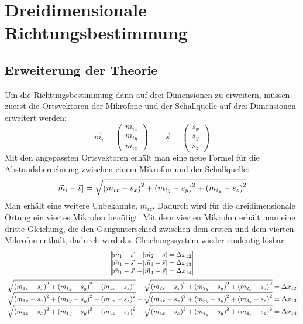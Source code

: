 \section{Dreidimensionale Richtungsbestimmung}
\subsection{Erweiterung der Theorie}
Um die Richtungsbestimmung dann auf drei Dimensionen zu erweitern, müssen zuerst die Ortsvektoren der Mikrofone und der Schallquelle auf drei Dimensionen erweitert werden:
\begin{equation}
    \vec{m}_i = \begin{pmatrix}
        m_{ix} \\
        m_{iy} \\
        m_{iz}
    \end{pmatrix} \quad\quad
    \vec{s} = \begin{pmatrix}
        {s_x} \\
        {s_y} \\
        {s_z}
    \end{pmatrix}
\end{equation}
Mit den angepassten Ortsvektoren erhält man eine neue Formel für die Abstandsberechnung zwischen einem Mikrofon und der Schallquelle:
\begin{equation}
    \abs{\vec{m}_i - \vec{s}} = \sqrt{{(m_{ix} - s_x)}^2 + {(m_{iy} - s_y)}^2 + {(m_{i_z} - s_z)}^2}
\end{equation}
Man erhält eine weitere Unbekannte, $m_{iz}$. Dadurch wird für die dreidimensionale Ortung ein viertes Mikrofon benötigt. Mit dem vierten Mikrofon erhält man eine dritte Gleichung, die den Gangunterschied zwischen dem ersten und dem vierten Mikrofon enthält, dadurch wird das Gleichungssystem wieder eindeutig lösbar:
\begin{gather*}
    \begin{vmatrix}
        \abs{\vec{m}_1 - \vec{s}} - \abs{\vec{m}_2 - \vec{s}} = \Delta{x_{12}} \\
        \abs{\vec{m}_1 - \vec{s}} - \abs{\vec{m}_3 - \vec{s}} = \Delta{x_{13}} \\
        \abs{\vec{m}_1 - \vec{s}} - \abs{\vec{m}_4 - \vec{s}} = \Delta{x_{14}}
    \end{vmatrix}\\
    \begin{vmatrix}
        \sqrt{{(m_{1x} - s_x)}^2 + {(m_{1y} - s_y)}^2 + {(m_{1z} - s_z)}^2} - \sqrt{{(m_{2x} - s_x)}^2 + {(m_{2y} - s_y)}^2 + {(m_{2_z} - s_z)}^2} = \Delta{x_{12}} \\
        \sqrt{{(m_{1x} - s_x)}^2 + {(m_{1y} - s_y)}^2 + {(m_{1z} - s_z)}^2} - \sqrt{{(m_{3x} - s_x)}^2 + {(m_{3y} - s_y)}^2 + {(m_{3_z} - s_z)}^2} = \Delta{x_{13}} \\
        \sqrt{{(m_{1x} - s_x)}^2 + {(m_{1y} - s_y)}^2 + {(m_{1z} - s_z)}^2} - \sqrt{{(m_{4x} - s_x)}^2 + {(m_{4_y} - s_y)}^2 + {(m_{4_z} - s_z)}^2} = \Delta{x_{14}}
    \end{vmatrix}
\end{gather*}
